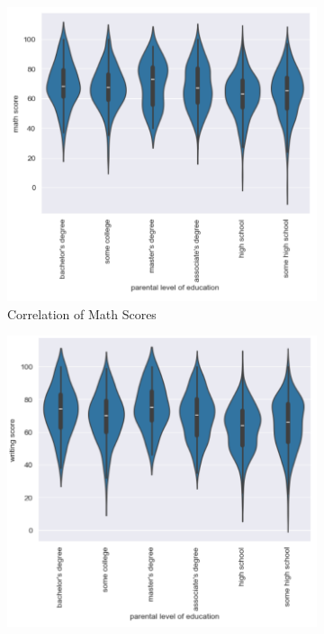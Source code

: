 \documentclass[doc]{apa6} %
\begin{document}
\begin{figure}[H]
    \centering
    \caption{Correlations of Parent Education to Student Scores}
    \begin{subfigure}[b]{0.28\textwidth}
    \includegraphics[width=\linewidth]{MathVsParent.png}
    \caption{Correlation of Math Scores}
    \label{fig:math}
    \end{subfigure}
    \begin{subfigure}[b]{0.28\textwidth}
    \includegraphics[width=\linewidth]{WritingVsParent.png}

\end{subfigure}
\end{figure}
\end{document}
